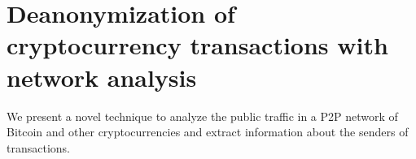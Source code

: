 
\chapter{Deanonymization of cryptocurrency transactions with network analysis} %

\label{Chapter03_Clustering} %

We present a novel technique to analyze the public traffic in a P2P network of Bitcoin and other cryptocurrencies and extract information about the senders of transactions.